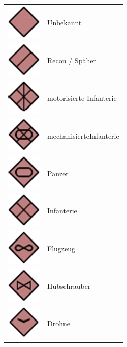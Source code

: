 \begin{longtable}{p{3cm} p{15cm}}
	\includegraphics[scale=1]{./img/fortgeschrittenes/karteUndMarkierungen/Unbekannt.png}		& 		Unbekannt \\
	\includegraphics[scale=1]{./img/fortgeschrittenes/karteUndMarkierungen/Recon.png}		 	& 		Recon / Späher \\
	\includegraphics[scale=1]{./img/fortgeschrittenes/karteUndMarkierungen/motorisierteInfanterie.png}		 & 		motorisierte Infanterie \\
	\includegraphics[scale=1]{./img/fortgeschrittenes/karteUndMarkierungen/mechanisierteInfanterie.png}		 & 		mechanisierteInfanterie\\
	\includegraphics[scale=1]{./img/fortgeschrittenes/karteUndMarkierungen/Panzer.png}		& 		Panzer \\
	\includegraphics[scale=1]{./img/fortgeschrittenes/karteUndMarkierungen/Infanterie.png}		& 		Infanterie \\
	\includegraphics[scale=1]{./img/fortgeschrittenes/karteUndMarkierungen/Flugzeug.png}		& 		Flugzeug \\
	\includegraphics[scale=1]{./img/fortgeschrittenes/karteUndMarkierungen/Hubschrauber.png}	&	 	Hubschrauber \\
	\includegraphics[scale=1]{./img/fortgeschrittenes/karteUndMarkierungen/Drohne.png}		& 		Drohne \\
\end{longtable}